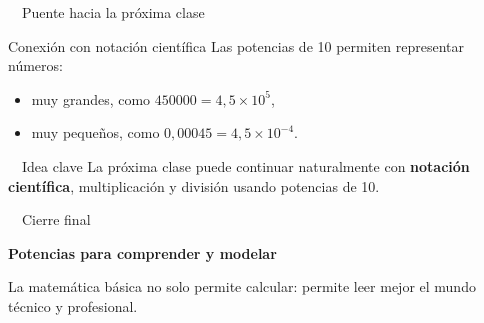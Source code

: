 \documentclass[aspectratio=169,10pt,handout]{beamer}
\newcommand{\destacar}[1]{\textcolor{USTBlueDark}{\textbf{#1}}}
\newcommand{\pp}{\pause}
\newcommand{\iconoCierre}{\faCheckCircle}
\newcommand{\iconoIdea}{\faLightbulb}
\newcommand{\iconoPuente}{\faArrowRight}
\newenvironment{ideaBox}
{\begin{exampleblock}{\iconoIdea\ \ Idea clave}}
	{\end{exampleblock}}
\begin{document}
	\begin{frame}{\iconoPuente\ \ Puente hacia la próxima clase}
		\begin{block}{Conexión con notación científica}
			Las potencias de 10 permiten representar números:
			\begin{itemize}
				\item muy grandes, como \(450000=4{,}5\times10^5\),
				\item muy pequeños, como \(0{,}00045=4{,}5\times10^{-4}\).
			\end{itemize}
		\end{block}
		
		\pp
		
		\begin{ideaBox}
			La próxima clase puede continuar naturalmente con \destacar{notación científica}, multiplicación y división usando potencias de 10.
		\end{ideaBox}
	\end{frame}
	
	\begin{frame}{\iconoCierre\ \ Cierre final}
		\begin{center}
			{\Huge\color{USTTeal}\faSeedling}
			
			\vspace{0.35cm}
			
			{\Large\bfseries\color{USTBlueDark}Potencias para comprender y modelar}
			
			\vspace{0.35cm}
			
			{\normalsize\textcolor{USTGray}{La matemática básica no solo permite calcular: permite leer mejor el mundo técnico y profesional.}}
		\end{center}
	\end{frame}
	
\end{document}
